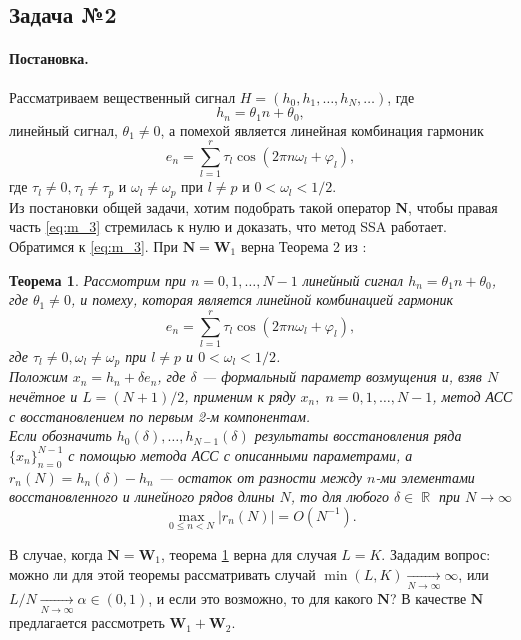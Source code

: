 \documentclass[specialist,
               substylefile = spbu_report.rtx,
               subf,href,colorlinks=true, 12pt]{disser}
\DeclareMathOperator\R{\mathbb{R}}
\newtheorem{theorem}{Теорема}
\newenvironment{statement}{\paragraph{Постановка.}}{\hfill}
\begin{document}
\subsection{Задача №2}
\begin{statement}
Рассматриваем вещественный сигнал $H = (h_0, h_1, \dots, h_N, \dots)$, где 
\begin{equation*}
	h_n = \theta_1n+\theta_0,
\end{equation*}
линейный сигнал, $\theta_1\neq0$, а помехой является линейная комбинация гармоник
\begin{equation*}
	e_n = \sum^r_{l=1}\tau_l\cos(2\pi n\omega_l + \varphi_l),
\end{equation*} 
где $\tau_l\neq0,\tau_l\neq\tau_p$ и $\omega_l \neq \omega_p$ при $l\neq p$ и $0 < \omega_l < 1/2$.
\\Из постановки общей задачи, хотим подобрать такой оператор $\mathbf{N}$, чтобы правая часть \eqref{eq:m_3} стремилась к нулю и доказать, что метод SSA работает.
\\Обратимся к \eqref{eq:m_3}. При $\mathbf{N} = \mathbf{W}_1$ верна Теорема 2 из \cite{ZNekrutkin}:
\begin{theorem}\label{th:3}
	Рассмотрим при $n=0,1,\dots,N-1$ линейный сигнал $h_n = \theta_1n+\theta_0$, где $\theta_1 \neq 0$, и помеху, которая является линейной комбинацией гармоник
	\begin{equation*}
		e_n = \sum^r_{l=1}\tau_l\cos(2\pi n\omega_l + \varphi_l),
	\end{equation*} 
	\emph{где} $\tau_l\neq0, \omega_l \neq \omega_p$ \emph{при} $l\neq p$ и $0 < \omega_l < 1/2$.\\
	Положим $x_n = h_n + \delta e_n$, где $\delta$ --- формальный параметр возмущения и, взяв $N$ нечётное и $L = (N+1)/2$, применим к ряду $x_n,\; n=0,1,\dots, N-1$, метод АСС с восстановлением по первым 2-м компонентам.\\
	Если обозначить $h_0(\delta),\dots, h_{N-1}(\delta)$ результаты восстановления ряда $\{x_n\}^{N-1}_{n=0}$ с помощью метода АСС с описанными параметрами, а $r_n(N)=h_n(\delta)-h_n$ --- остаток от разности между $n$-ми элементами восстановленного и линейного рядов длины $N$, то для любого $\delta\in\R$ при $N\rightarrow\infty$
	\begin{equation*}
		\max_{0\leqslant n<N}|r_n(N)|=O(N^{-1}).
	\end{equation*}
\end{theorem}
В случае, когда $\mathbf{N} = \mathbf{W}_1$, теорема \ref{th:3} верна для случая $L=K$. Зададим вопрос: можно ли для этой теоремы рассматривать случай $\min(L,K)\underset{N\rightarrow\infty}{\longrightarrow}\infty$, или $L/N\underset{N\rightarrow\infty}{\longrightarrow}\alpha\in(0,1)$, и если это возможно, то для какого $\mathbf{N}$? В качестве $\mathbf{N}$ предлагается рассмотреть $\mathbf{W}_1 + \mathbf{W}_2$. 
\end{statement}
\end{document}
